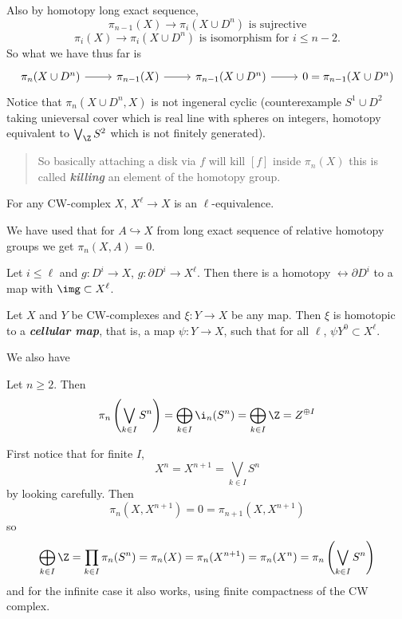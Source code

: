 \begin{remark}
Also by homotopy long exact sequence,
\[\pi_{n-1}(X)\to \pi_i(X\cup D^n)\text{ is sujrective}\]
\[\pi_i(X)\to \pi_{i}(X\cup D^n)\text{ is isomorphism for }i\leq n-2.\]
So what we have thus far is
\[\begin{tikzcd}
	\pi_n(X\cup D^n)\arrow[r]&\pi_{n-1}(X)\arrow[r]&\pi_{n-1}(X\cup D^n)\arrow[r]&0=\pi_{n-1}(X\cup D^n)
\end{tikzcd}\]
Notice that $\pi_n(X\cup D^n,X)$ is not ingeneral cyclic (counterexample $S^1\cup D^2$ taking unieversal cover which is real line with spheres on integers, homotopy equivalent to $\bigvee_\Z S^2$ which is not finitely generated).

\begin{quote}
	{\color{red} So basically attaching a disk via $f$ will kill $[f]$ inside $\pi_n(X)$ this is called \textbf{\textit{killing}} an element of the homotopy group.}
\end{quote}

\begin{prop}
	For any CW-complex $X$, $X^\ell\to X$ is an $\ell$-equivalence.
\end{prop}

\begin{remark}
	We have used that for $A\hookrightarrow X$ from long exact sequence of relative homotopy groups we get $\pi_n(X,A)=0$.
\end{remark}

\begin{coro}
	Let $i\leq \ell$ and $g: D^i\to X$, $g:\partial D^i\to X^\ell$. Then there is a homotopy $\rel\partial D^i$ to a map with $\img\subset X^\ell$.
\end{coro}

\begin{thm}
	Let $X$ and $Y$ be CW-complexes and $\xi:Y\to X$ be any map. Then $\xi$ is homotopic to a \textbf{\textit{cellular map}}, that is, a map $\psi:Y\to X$, such that for all $\ell$, $\psi Y^0\subset X^\ell$.
\end{thm}

We also have
\begin{prop}
	Let $n\geq 2$. Then 
	\[\pi_n\left(\bigvee_{k\in I}S^n\right)=\bigoplus_{k\in I}\i_n(S^n)=\bigoplus_{k\in I}\Z=Z^{\oplus I}\]
\end{prop}
\begin{prop}
	First notice that for finite $I$,
	\[X^n=X^{n+1}=\bigvee_{k\in I}S^n\]
	by looking carefully. Then
	\[\pi_n(X,X^{n+1})=0=\pi_{n+1}(X,X^{n+1})\]
	so
	\[\bigoplus_{k\in I}\Z=\prod_{k\in I}\pi_n(S^n)=\pi_n(X)=\pi_n(X^{n+1})=\pi_n(X^n)=\pi_n\left(\bigvee_{k\in I}S^n\right)\]
	and for the infinite case it also works, using finite compactness of the CW complex.
\end{prop}


\end{remark}
